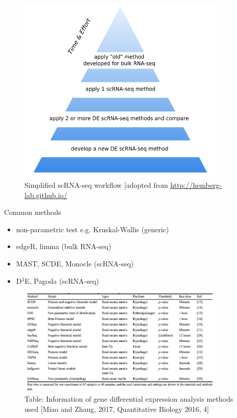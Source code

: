 \documentclass{beamer}\usepackage[]{graphicx}\usepackage[]{color}
\begin{document}
\begin{frame}
\begin{center}
\begin{figure}
\includegraphics[width=10cm]{Images/solutionTriangle.png}
\caption{Simplified scRNA-seq workflow [adopted from \href{http://hemberg-lab.github.io/]}{http://hemberg-lab.github.io/}}
\end{figure}
\end{center}
\end{frame}

\begin{frame}
\begin{block}{Common methods}
\begin{itemize}
  \item non-parametric test e.g. Kruskal-Wallis (generic)
  \item edgeR, limma (bulk RNA-seq)
  \item MAST, SCDE, Monocle (scRNA-seq)
  \item D$^3$E, Pagoda (scRNA-seq)
 \end{itemize}
\end{block}
\end{frame}

\begin{frame}
\begin{center}
\begin{figure}
\includegraphics[width=10cm]{Images/MiaoTable1.png}
\caption{Table: Information of gene differential expression analysis methods used [Miao and Zhang, 2017, Quantitative Biology 2016, 4]}
\end{figure}
\end{center}
\end{frame}
\end{document}
